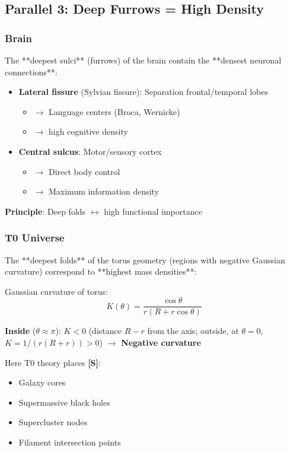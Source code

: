 	\subsection{Parallel 3: Deep Furrows = High Density}

	\subsubsection{Brain}

	The **deepest sulci** (furrows) of the brain contain the **densest neuronal connections**:

	\begin{itemize}
		\item \textbf{Lateral fissure} (Sylvian fissure): Separation frontal/temporal lobes
		\begin{itemize}
			\item $\to$ Language centers (Broca, Wernicke)
			\item $\to$ high cognitive density
		\end{itemize}
		\item \textbf{Central sulcus}: Motor/sensory cortex
		\begin{itemize}
			\item $\to$ Direct body control
			\item $\to$ Maximum information density
		\end{itemize}
	\end{itemize}

	\textbf{Principle}: Deep folds $\leftrightarrow$ high functional importance

	\subsubsection{T0 Universe}

	The **deepest folds** of the torus geometry (regions with negative Gaussian curvature) correspond to **highest mass densities**:

	Gaussian curvature of torus:
	\begin{equation}
		K(\theta) = \frac{\cos\theta}{r(R + r\cos\theta)}
	\end{equation}

	\textbf{Inside} ($\theta \approx \pi$): $K < 0$ (distance $R - r$ from the axis; outside, at $\theta = 0$, $K = 1/(r(R+r)) > 0$) $\to$ \textbf{Negative curvature}

	Here T0 theory places \textbf{[S]}:
	\begin{itemize}
		\item Galaxy cores
		\item Supermassive black holes
		\item Supercluster nodes
		\item Filament intersection points
	\end{itemize}

